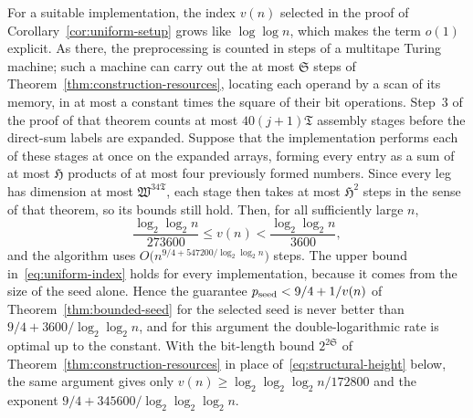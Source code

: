 \begin{remark}\label{rem:uniform-rate}
For a suitable implementation, the index \(v(n)\) selected in the proof
of Corollary~\ref{cor:uniform-setup} grows like \(\log\log n\), which
makes the term \(o(1)\) explicit. As there, the preprocessing is
counted in steps of a multitape Turing machine; such a machine can
carry out the at most \(\mathfrak S\) steps of
Theorem~\ref{thm:construction-resources}, locating each operand by a
scan of its memory, in at most a constant times the square of their bit
operations. Step~3 of the proof of that theorem counts at most
\(40(j+1)\mathfrak T\) assembly stages before the direct-sum labels are
expanded. Suppose that the implementation performs each of these stages
at once on the expanded arrays, forming every entry as a sum of at most
\(\mathfrak H\) products of at most four previously formed numbers.
Since every leg has dimension at most \(\mathfrak W^{34\mathfrak T}\),
each stage then takes at most \(\mathfrak H^2\) steps in the sense of
that theorem, so its bounds still hold. Then, for all sufficiently large \(n\),
\begin{equation}\label{eq:uniform-index}
 \frac{\log_2\log_2n}{273600}\le v(n)<\frac{\log_2\log_2n}{3600},
\end{equation}
and the algorithm uses \(O\bigl(n^{9/4+547200/\log_2\log_2n}\bigr)\)
steps. The upper bound in~\eqref{eq:uniform-index} holds for every
implementation, because it comes from the size of the seed alone. Hence
the guarantee \(p_{\rm seed}<9/4+1/v(n)\) of
Theorem~\ref{thm:bounded-seed} for the selected seed is never better
than \(9/4+3600/\log_2\log_2n\), and for this argument the
double-logarithmic rate is optimal up to the constant. With the
bit-length bound \(2^{2\mathfrak S}\) of
Theorem~\ref{thm:construction-resources} in place
of~\eqref{eq:structural-height} below, the same argument gives only
\(v(n)\ge\log_2\log_2\log_2n/172800\) and the exponent
\(9/4+345600/\log_2\log_2\log_2n\).
\end{remark}

